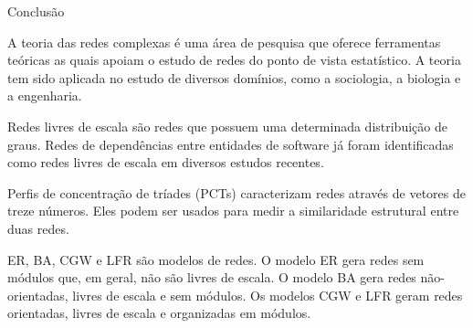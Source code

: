 \begin{section}{Conclusão} %
	
	A teoria das redes complexas é uma área de pesquisa que oferece ferramentas teóricas as quais apoiam o estudo de redes do ponto de vista estatístico. A teoria tem sido aplicada no estudo de diversos domínios, como a sociologia, a biologia e a engenharia.
	
	Redes livres de escala são redes que possuem uma determinada distribuição de graus. Redes de dependências entre entidades de software já foram identificadas como redes livres de escala em diversos estudos recentes.
	
	Perfis de concentração de tríades (PCTs) caracterizam redes através de vetores de treze números. Eles podem ser usados para medir a similaridade estrutural entre duas redes.
	
	ER, BA, CGW e LFR são modelos de redes. O modelo ER gera redes sem módulos que, em geral, não são livres de escala. O modelo BA gera redes não-orientadas, livres de escala e sem módulos. Os modelos CGW e LFR geram redes orientadas, livres de escala e organizadas em módulos.
		
\end{section}
